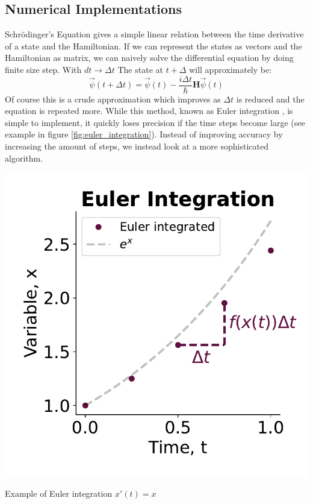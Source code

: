 \subsection{Numerical Implementations}\label{sec:numerical_implementations}
Schrödinger's Equation gives a simple linear relation between the time derivative of a state and the Hamiltonian. If we can represent the states as vectors and the Hamiltonian as matrix, we can naively solve the differential equation by doing finite size step. With $dt\to\Delta t$ The state at $t+\Delta$ will approximately be:
\begin{equation}
    \Vec{\psi}(t + \Delta t) =  \Vec{\psi}(t) - \frac{i\Delta t}{\hbar}\boldsymbol{H} \Vec{\psi}(t)
\end{equation}
Of course this is a crude approximation which improves as $\Delta t$ is reduced and the equation is repeated more. While this method, known as Euler integration \cite{euler}, is simple to implement, it quickly loses precision if the time steps become large (see example in figure \ref{fig:euler_integration}). Instead of improving accuracy by increasing the amount of steps, we instead look at a more sophisticated algorithm.
\begin{marginfigure}
    \centering
    \includegraphics[]{Figs/Theory/euler_integration.pdf}
    \caption{Example of Euler integration $x'(t) = x$}
    \label{fig:euler_integration}
\end{marginfigure}


